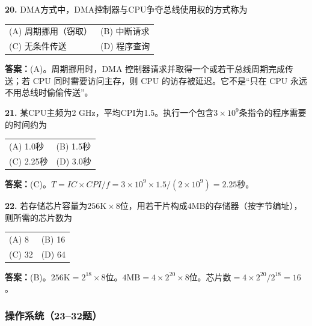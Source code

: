 \vspace{6pt}

\noindent\textbf{20.} DMA方式中，DMA控制器与CPU争夺总线使用权的方式称为
\begin{center}
\begin{tabular}{ll}
(A) 周期挪用（窃取）& (B) 中断请求 \\[6pt]
(C) 无条件传送 & (D) 程序查询
\end{tabular}
\end{center}

\ifshowsolutions\par\noindent\textbf{答案：}(A)。周期挪用时，DMA 控制器请求并取得一个或若干总线周期完成传送；若 CPU 同时需要访问主存，则 CPU 的访存被延迟。它不是“只在 CPU 永远不用总线时偷偷传送”。\else \answerarea \fi

\vspace{6pt}

\noindent\textbf{21.} 某CPU主频为2 GHz，平均CPI为1.5。执行一个包含$3\times 10^9$条指令的程序需要的时间约为
\begin{center}
\begin{tabular}{ll}
(A) 1.0秒 & (B) 1.5秒 \\[6pt]
(C) 2.25秒 & (D) 3.0秒
\end{tabular}
\end{center}

\ifshowsolutions\par\noindent\textbf{答案：}(C)。$T=IC\times CPI/f=3\times10^9\times 1.5/(2\times10^9)=2.25$秒。\else \answerarea \fi

\vspace{6pt}

\noindent\textbf{22.} 若存储芯片容量为$256\text{K}\times 8$位，用若干片构成$4\text{MB}$的存储器（按字节编址），则所需的芯片数为
\begin{center}
\begin{tabular}{ll}
(A) 8 & (B) 16 \\[6pt]
(C) 32 & (D) 64
\end{tabular}
\end{center}

\ifshowsolutions\par\noindent\textbf{答案：}(B)。$256\text{K}=2^{18}\times 8$位。$4\text{MB}=4\times 2^{20}\times 8$位。芯片数$=4\times 2^{20}/2^{18}=16$。\else \answerarea \fi

\subsubsection*{操作系统（23--32题）}

